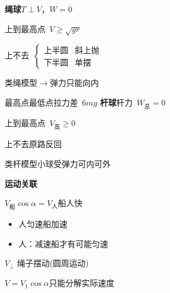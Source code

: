 \textbf{绳球}\quad $T\perp V$，$W=0$

上到最高点\ $V\ge\sqrt{gr}$


上不去\ $\left\{\begin{array}{ll}\text{上半圆} & \text{斜上抛}\\ \text{下半圆} & \text{单摆}\end{array}\right.$

类绳模型$\to$弹力只能向内

最高点最低点拉力差\ $6mg$
\textbf{杆球}\quad 杆力\ $W_{\text{总}}=0$

上到最高点\ $V_{\text{高}}\ge0$

上不去\quad 原路反回 %

类杆模型\quad 小球受弹力可内可外


\textbf{运动关联}%

\noindent $V_{\text{船}}\cos\alpha=V_{\text{人}}$\quad 船人快%

\begin{itemize}
\item 人匀速船加速
\item 人：减速船才有可能匀速
\end{itemize}

\noindent $V_{\perp}$ 绳子摆动(圆周运动)%

\noindent $V=V_1\cos\alpha$\qquad 只能分解实际速度

